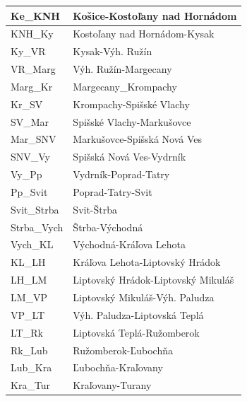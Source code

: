 \documentclass[11pt,a4paper]{article}
\begin{document}
\begin{table}[H]
    \centering
    \begin{tabular}{|l|l|}
    \hline
    Ke\_KNH       & Košice-Kostoľany nad Hornádom                \\ \hline
    KNH\_Ky       & Kostoľany nad Hornádom-Kysak                 \\ \hline
    Ky\_VR        & Kysak-Výh. Ružín                             \\ \hline
    VR\_Marg      & Výh. Ružín-Margecany                         \\ \hline
    Marg\_Kr      & Margecany\_Krompachy                         \\ \hline
    Kr\_SV        & Krompachy-Spišské Vlachy                     \\ \hline
    SV\_Mar       & Spišské Vlachy-Markušovce                    \\ \hline
    Mar\_SNV      & Markušovce-Spišská Nová Ves                  \\ \hline
    SNV\_Vy       & Spišská Nová Ves-Vydrník                     \\ \hline
    Vy\_Pp        & Vydrník-Poprad-Tatry                         \\ \hline
    Pp\_Svit      & Poprad-Tatry-Svit                            \\ \hline
    Svit\_Strba   & Svit-Štrba                                   \\ \hline
    Strba\_Vych   & Štrba-Východná                               \\ \hline
    Vych\_KL      & Východná-Kráľova Lehota                      \\ \hline
    KL\_LH        & Kráľova Lehota-Liptovský Hrádok              \\ \hline
    LH\_LM        & Liptovský Hrádok-Liptovský Mikuláš           \\ \hline
    LM\_VP        & Liptovský Mikuláš-Výh. Paludza               \\ \hline
    VP\_LT        & Výh. Paludza-Liptovská Teplá                 \\ \hline
    LT\_Rk        & Liptovská Teplá-Ružomberok                   \\ \hline
    Rk\_Lub       & Ružomberok-Ľubochňa                          \\ \hline
    Lub\_Kra      & Ľubochňa-Kraľovany                           \\ \hline
    Kra\_Tur      & Kraľovany-Turany                             \\ \hline

\end{tabular}
\end{table}
\end{document}
